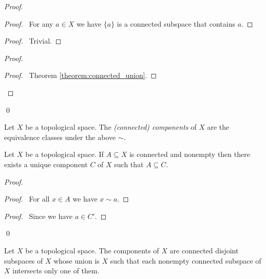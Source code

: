 \begin{proof}
    \pf
    \begin{proof}
        \pf\ For any $a \in X$ we have $\{a\}$ is a connected subspace that
        contains $a$.
    \end{proof}
    \begin{proof}
        \pf\ Trivial.
    \end{proof}
    \begin{proof}
        \begin{proof}
            \pf\ Theorem \ref{theorem:connected_union}.
        \end{proof}
    \end{proof}
    \qed
\end{proof}

\begin{definition}
    Let $X$ be a topological space. The \emph{(connected) components} of
    $X$ are the equivalence classes under the above $\sim$.
\end{definition}

\begin{lemma}
    \label{lemma:component_includes_connected}
    Let $X$ be a topological space. If $A \subseteq X$ is connected 
    and nonempty then there
    exists a unique component $C$ of $X$ such that $A \subseteq C$.
\end{lemma}

\begin{proof}
    \pf
    \begin{proof}
        \pf\ For all $x \in A$ we have $x \sim a$.
    \end{proof}
    \begin{proof}
        \pf\ Since we have $a \in C'$.
    \end{proof}
    \qed
\end{proof}

\begin{theorem}
    Let $X$ be a topological space. The components of $X$ are connected
    disjoint subspaces of $X$ whose union is $X$ such that each nonempty
    connected subspace of $X$ intersects only one of them.
\end{theorem}

